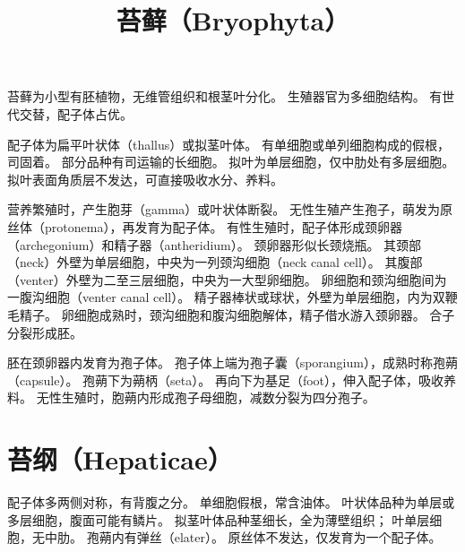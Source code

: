 \documentclass[11pt]{article}
\title{苔藓（Bryophyta）}
\date{}
\begin{document}
  \maketitle

  \linenumbers
苔藓为小型有胚植物，无维管组织和根茎叶分化。
生殖器官为多细胞结构。
有世代交替，配子体占优。

\newline

配子体为扁平叶状体（thallus）或拟茎叶体。
有单细胞或单列细胞构成的假根，司固着。
部分品种有司运输的长细胞。
拟叶为单层细胞，仅中肋处有多层细胞。
拟叶表面角质层不发达，可直接吸收水分、养料。

\newline

营养繁殖时，产生胞芽（gamma）或叶状体断裂。
无性生殖产生孢子，萌发为原丝体（protonema），再发育为配子体。
有性生殖时，配子体形成颈卵器（archegonium）和精子器（antheridium）。
颈卵器形似长颈烧瓶。
其颈部（neck）外壁为单层细胞，中央为一列颈沟细胞（neck canal cell）。
其腹部（venter）外壁为二至三层细胞，中央为一大型卵细胞。
卵细胞和颈沟细胞间为一腹沟细胞（venter canal cell）。
精子器棒状或球状，外壁为单层细胞，内为双鞭毛精子。
卵细胞成熟时，颈沟细胞和腹沟细胞解体，精子借水游入颈卵器。
合子分裂形成胚。

\newline

胚在颈卵器内发育为孢子体。
孢子体上端为孢子囊（sporangium），成熟时称孢蒴（capsule）。
孢蒴下为蒴柄（seta）。
再向下为基足（foot），伸入配子体，吸收养料。
无性生殖时，胞蒴内形成孢子母细胞，减数分裂为四分孢子。

\section{苔纲（Hepaticae）}
配子体多两侧对称，有背腹之分。
单细胞假根，常含油体。
叶状体品种为单层或多层细胞，腹面可能有鳞片。
拟茎叶体品种茎细长，全为薄壁组织；
叶单层细胞，无中肋。
孢蒴内有弹丝（elater）。
原丝体不发达，仅发育为一个配子体。


\section{}
\end{document}

